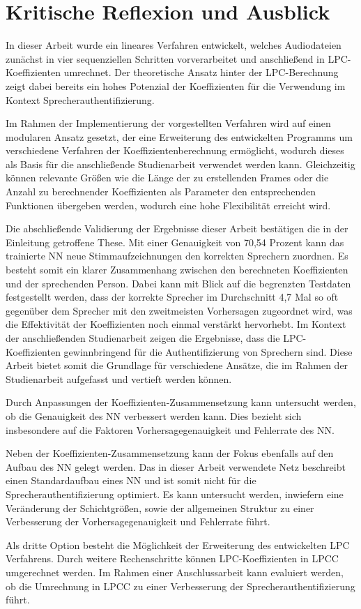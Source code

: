 \section{Kritische Reflexion und Ausblick}\label{sec:Ausblick}
In dieser Arbeit wurde ein lineares Verfahren entwickelt, welches Audiodateien zunächst in vier sequenziellen Schritten vorverarbeitet und anschließend in \ac{LPC}-Koeffizienten umrechnet.
Der theoretische Ansatz hinter der \ac{LPC}-Berechnung zeigt dabei bereits ein hohes Potenzial der Koeffizienten für die Verwendung im Kontext Sprecherauthentifizierung.

Im Rahmen der Implementierung der vorgestellten Verfahren wird auf einen modularen Ansatz gesetzt, der eine Erweiterung des entwickelten Programms um verschiedene Verfahren der Koeffizientenberechnung ermöglicht, wodurch dieses als Basis für die anschließende Studienarbeit verwendet werden kann.
Gleichzeitig können relevante Größen wie die Länge der zu erstellenden Frames oder die Anzahl zu berechnender Koeffizienten als Parameter den entsprechenden Funktionen übergeben werden, wodurch eine hohe Flexibilität erreicht wird.

Die abschließende Validierung der Ergebnisse dieser Arbeit bestätigen die in der Einleitung getroffene These.
Mit einer Genauigkeit von 70,54 Prozent kann das trainierte \ac{NN} neue Stimmaufzeichnungen den korrekten Sprechern zuordnen.
Es besteht somit ein klarer Zusammenhang zwischen den berechneten Koeffizienten und der sprechenden Person.
Dabei kann mit Blick auf die begrenzten Testdaten festgestellt werden, dass der korrekte Sprecher im Durchschnitt 4,7 Mal so oft gegenüber dem Sprecher mit den zweitmeisten Vorhersagen zugeordnet wird, was die Effektivität der Koeffizienten noch einmal verstärkt hervorhebt.
\newline
\newline
Im Kontext der anschließenden Studienarbeit zeigen die Ergebnisse, dass die \ac{LPC}-Koeffizienten gewinnbringend für die Authentifizierung von Sprechern sind.
Diese Arbeit bietet somit die Grundlage für verschiedene Ansätze, die im Rahmen der Studienarbeit aufgefasst und vertieft werden können.

Durch Anpassungen der Koeffizienten-Zusammensetzung kann untersucht werden, ob die Genauigkeit des \ac{NN} verbessert werden kann.
Dies bezieht sich insbesondere auf die Faktoren Vorhersagegenauigkeit und Fehlerrate des \ac{NN}.

Neben der Koeffizienten-Zusammensetzung kann der Fokus ebenfalls auf den Aufbau des \ac{NN} gelegt werden.
Das in dieser Arbeit verwendete Netz beschreibt einen Standardaufbau eines \ac{NN} und ist somit nicht für die Sprecherauthentifizierung optimiert.
Es kann untersucht werden, inwiefern eine Veränderung der Schichtgrößen, sowie der allgemeinen Struktur zu einer Verbesserung der Vorhersagegenauigkeit und Fehlerrate führt.

Als dritte Option besteht die Möglichkeit der Erweiterung des entwickelten \ac{LPC} Verfahrens.
Durch weitere Rechenschritte können \ac{LPC}-Koeffizienten in \ac{LPCC} umgerechnet werden.
Im Rahmen einer Anschlussarbeit kann evaluiert werden, ob die Umrechnung in \ac{LPCC} zu einer Verbesserung der Sprecherauthentifizierung führt.